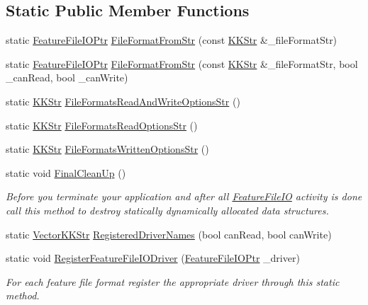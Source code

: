 \subsection*{Static Public Member Functions}
\begin{DoxyCompactItemize}
\item 
static \hyperlink{class_k_k_m_l_l_1_1_feature_file_i_o_a12e6dd6bcaf2576238622568d92f981f}{Feature\+File\+I\+O\+Ptr} \hyperlink{class_k_k_m_l_l_1_1_feature_file_i_o_a0402c7bc9a8d6cfeb0bedcfac4a28e38}{File\+Format\+From\+Str} (const \hyperlink{class_k_k_b_1_1_k_k_str}{K\+K\+Str} \&\+\_\+file\+Format\+Str)
\item 
static \hyperlink{class_k_k_m_l_l_1_1_feature_file_i_o_a12e6dd6bcaf2576238622568d92f981f}{Feature\+File\+I\+O\+Ptr} \hyperlink{class_k_k_m_l_l_1_1_feature_file_i_o_a61e282537967f78944f90d65820fb13d}{File\+Format\+From\+Str} (const \hyperlink{class_k_k_b_1_1_k_k_str}{K\+K\+Str} \&\+\_\+file\+Format\+Str, bool \+\_\+can\+Read, bool \+\_\+can\+Write)
\item 
static \hyperlink{class_k_k_b_1_1_k_k_str}{K\+K\+Str} \hyperlink{class_k_k_m_l_l_1_1_feature_file_i_o_abd247f9526f3363b1f14ae11c56e4c86}{File\+Formats\+Read\+And\+Write\+Options\+Str} ()
\item 
static \hyperlink{class_k_k_b_1_1_k_k_str}{K\+K\+Str} \hyperlink{class_k_k_m_l_l_1_1_feature_file_i_o_adbd141359ab0d88de75f3806626d57c1}{File\+Formats\+Read\+Options\+Str} ()
\item 
static \hyperlink{class_k_k_b_1_1_k_k_str}{K\+K\+Str} \hyperlink{class_k_k_m_l_l_1_1_feature_file_i_o_a9e9499112a82850cb3a36b609963e71b}{File\+Formats\+Written\+Options\+Str} ()
\item 
static void \hyperlink{class_k_k_m_l_l_1_1_feature_file_i_o_aeb842177c7e2152e93e1f69eeaf84ed0}{Final\+Clean\+Up} ()
\begin{DoxyCompactList}\small\item\em Before you terminate your application and after all \hyperlink{class_k_k_m_l_l_1_1_feature_file_i_o}{Feature\+File\+IO} activity is done call this method to destroy statically dynamically allocated data structures. \end{DoxyCompactList}\item 
static \hyperlink{class_k_k_b_1_1_vector_k_k_str}{Vector\+K\+K\+Str} \hyperlink{class_k_k_m_l_l_1_1_feature_file_i_o_a37a95e4e9217a03b2766e2a1c595e564}{Registered\+Driver\+Names} (bool can\+Read, bool can\+Write)
\item 
static void \hyperlink{class_k_k_m_l_l_1_1_feature_file_i_o_adbfa02f160488be79107e018e5143676}{Register\+Feature\+File\+I\+O\+Driver} (\hyperlink{class_k_k_m_l_l_1_1_feature_file_i_o_a12e6dd6bcaf2576238622568d92f981f}{Feature\+File\+I\+O\+Ptr} \+\_\+driver)
\begin{DoxyCompactList}\small\item\em For each feature file format register the appropriate driver through this static method. \end{DoxyCompactList}\end{DoxyCompactItemize}
